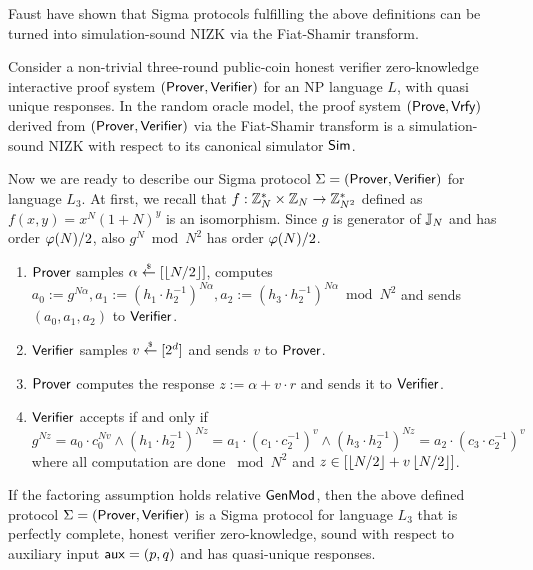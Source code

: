 Faust \etal \cite{INDOCRYPT:FKMV12} have shown that Sigma protocols fulfilling the above definitions can be turned into simulation-sound NIZK via the Fiat-Shamir transform. 

\begin{theorem}\label{thm:fs}
Consider a non-trivial three-round public-coin honest verifier zero-knowledge interactive proof system $(\mathsf{Prover}, \mathsf{Verifier})$ for an NP language $L$, with quasi unique responses. In the random oracle model, the proof system $(\mathsf{Prove}, \mathsf{Vrfy})$ derived from $(\mathsf{Prover}, \mathsf{Verifier})$ via the Fiat-Shamir transform is a simulation-sound NIZK with respect to its canonical simulator $\mathsf{Sim}$.
\end{theorem}

Now we are ready to describe our Sigma protocol $\Sigma = (\mathsf{Prover}, \mathsf{Verifier})$ for language $L_3$. At first, we recall that $f:\mathbb{Z}_N^* \times \mathbb{Z}_N \rightarrow \mathbb{Z}_{N^2}^*$ defined as $f(x,y)=x^N(1+N)^y$ is an isomorphism. Since $g$ is generator of $\mathbb{J}_N$ and has order $\varphi(N)/2$, also $g^N \bmod N^2$ has order $\varphi(N)/2$. 
\begin{enumerate}
\item $\mathsf{Prover}$ samples $\alpha \stackrel{{\scriptscriptstyle\$}}{\leftarrow} [\left\lfloor N/2 \right\rfloor]$, computes $a_0:=g^{N\alpha}, a_1:= (h_1\cdot h_2^{-1})^{N\alpha}, a_2:= (h_3\cdot h_2^{-1})^{N\alpha} \bmod N^2$ and sends $(a_0, a_1, a_2)$ to $\mathsf{Verifier}$.
\item $\mathsf{Verifier}$ samples $v \stackrel{{\scriptscriptstyle\$}}{\leftarrow} [2^d]$ and sends $v$ to $\mathsf{Prover}$.
\item $\mathsf{Prover}$ computes the response $z:= \alpha + v \cdot r$ and sends it to $\mathsf{Verifier}$.
\item $\mathsf{Verifier}$ accepts if and only if $g^{Nz} = a_0 \cdot c_0^{Nv} \land (h_1\cdot h_2^{-1})^{Nz} = a_1 \cdot (c_1\cdot c_2^{-1})^v  \land (h_3\cdot h_2^{-1})^{Nz} = a_2 \cdot (c_3\cdot c_2^{-1})^v$ where all computation are done $\bmod N^2$ and $z \in [\left\lfloor N/2 \right\rfloor + v\left\lfloor N/2 \right\rfloor]$.
\end{enumerate}

\begin{theorem}
\label{thm:SigmaROMFactoring}
If the factoring assumption holds relative $\mathsf{GenMod}$, then the above defined protocol $\Sigma = (\mathsf{Prover}, \mathsf{Verifier})$ is a Sigma protocol for language $L_3$ that is perfectly complete, honest verifier zero-knowledge, sound with respect to auxiliary input $\mathsf{aux}=(p,q)$ and has quasi-unique responses. 
\end{theorem}

